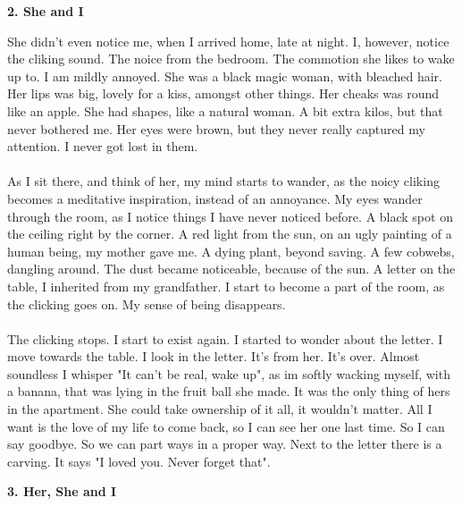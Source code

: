 \documentclass[]{article}
\begin{document}
\begin{center}
	\large\textbf{2. She and I}
\end{center}

She didn't even notice me, when I arrived home, late at night. I, however, notice the cliking sound. The noice from the bedroom. The commotion she likes to wake up to. I am mildly annoyed. She was a black magic woman, with bleached hair. Her lips was big, lovely for a kiss, amongst other things. Her cheaks was round like an apple. She had shapes, like a natural woman. A bit extra kilos, but that never bothered me. Her eyes were brown, but they never really captured my attention. I never got lost in them. 
\\ \\
As I sit there, and think of her, my mind starts to wander, as the noicy cliking  becomes a meditative inspiration, instead of an annoyance. My eyes wander through the room, as I notice things I have never noticed before. A black spot on the ceiling right by the corner. A red light from the sun, on an ugly painting of a human being, my mother gave me. A dying plant, beyond saving. A few cobwebs, dangling around. The dust became noticeable, because of the sun. A letter on the table, I inherited from my grandfather. I start to become a part of the room, as the clicking goes on. My sense of being disappears. 
\\ \\
The clicking stops. I start to exist again. I started to wonder about the letter. I move towards the table. I look in the letter. It's from her. It's over. Almost soundless I whisper "It can't be real, wake up", as im softly wacking myself, with a banana, that was lying in the fruit ball she made. It was the only thing of hers in the apartment. She could take ownership of it all, it wouldn't matter. All I want is the love of my life to come back, so I can see her one last time. So I can say goodbye. So we can part ways in a proper way. Next to the letter there is a carving. It says "I loved you. Never forget that".

\begin{center}
	\large\textbf{3. Her, She and I}
\end{center}
\end{document}
